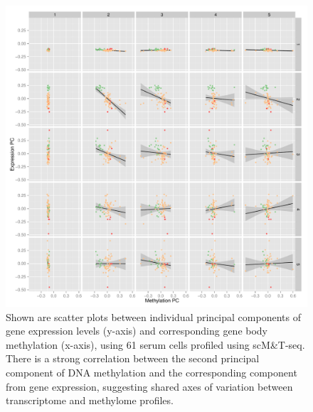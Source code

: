 \begin{figure}[htbp!]
\centering
\includegraphics[width=1.0\textwidth]{cca_cor}
\caption[Scatter-plot matrix of principal components from methylation and gene expression profiles.]{Shown are scatter plots between individual principal components of gene expression levels (y-axis) and corresponding gene body methylation (x-axis), using 61 serum cells profiled using scM\&T-seq. There is a strong correlation between the second principal component of DNA methylation and the corresponding component from gene expression, suggesting shared axes of variation between transcriptome and methylome profiles.}
\label{fig:mt_cca_cor}
\end{figure}

